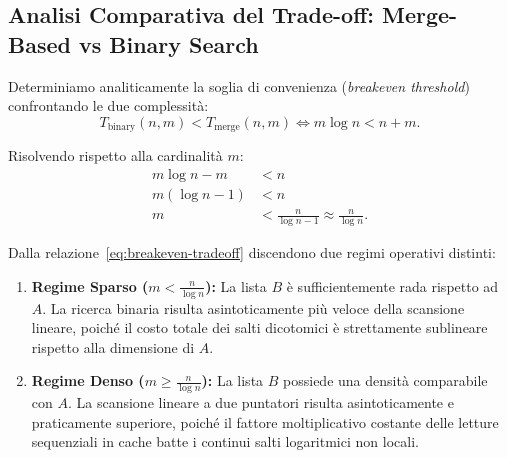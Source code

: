 \FloatBarrier
\subsection{Analisi Comparativa del Trade-off: Merge-Based vs Binary Search}
Determiniamo analiticamente la soglia di convenienza (\textit{breakeven threshold}) confrontando le due complessità:
\begin{equation}
  T_{\text{binary}}(n, m) < T_{\text{merge}}(n, m) \iff m \log n < n + m.
\end{equation}

Risolvendo rispetto alla cardinalità $m$:
\begin{align}
  m \log n - m &< n \nonumber \\
  m (\log n - 1) &< n \nonumber \\
  m &< \frac{n}{\log n - 1} \approx \frac{n}{\log n}.
  \label{eq:breakeven-tradeoff}
\end{align}

\begin{corollary}
Dalla relazione~\eqref{eq:breakeven-tradeoff} discendono due regimi operativi distinti:
\begin{enumerate}
  \item \textbf{Regime Sparso ($m < \frac{n}{\log n}$):} La lista $B$ è sufficientemente rada rispetto ad $A$. La ricerca binaria risulta asintoticamente più veloce della scansione lineare, poiché il costo totale dei salti dicotomici è strettamente sublineare rispetto alla dimensione di $A$.
  \item \textbf{Regime Denso ($m \ge \frac{n}{\log n}$):} La lista $B$ possiede una densità comparabile con $A$. La scansione lineare a due puntatori risulta asintoticamente e praticamente superiore, poiché il fattore moltiplicativo costante delle letture sequenziali in cache batte i continui salti logaritmici non locali.
\end{enumerate}
\end{corollary}

